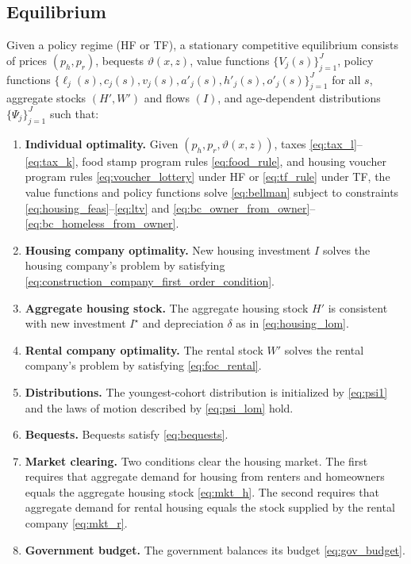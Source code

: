 \documentclass[parskip=full]{article}
\theoremstyle{plain}
\theoremstyle{definition}
\theoremstyle{remark}
\begin{document}
\subsection{Equilibrium}\label{sec:eqm}

Given a policy regime (HF or TF), a stationary competitive equilibrium consists of prices $(p_h,p_r)$, bequests $\vartheta(x,z)$, value functions $\{V_j(s)\}_{j=1}^J$, policy functions $\{\ell_j(s),c_j(s),v_j(s),a'_j(s),h'_j(s),o'_j(s)\}_{j=1}^J$ for all $s$, aggregate stocks $(H',W')$ and flows $(I)$, and age-dependent distributions $\{\Psi_j\}_{j=1}^J$ such that:

\begin{enumerate}
\item \textbf{Individual optimality.} Given $(p_h,p_r,\vartheta(x,z))$, taxes \eqref{eq:tax_l}--\eqref{eq:tax_k}, food stamp program rules \eqref{eq:food_rule}, and housing voucher program rules \eqref{eq:voucher_lottery} under HF or \eqref{eq:tf_rule} under TF, the value functions and policy functions solve \eqref{eq:bellman} subject to constraints \eqref{eq:housing_feas}--\eqref{eq:ltv} and \eqref{eq:bc_owner_from_owner}--\eqref{eq:bc_homeless_from_owner}.

\item \textbf{Housing company optimality.} New housing investment $I$ solves the housing company's problem by satisfying \eqref{eq:construction_company_first_order_condition}.

\item \textbf{Aggregate housing stock.} The aggregate housing 
stock $H'$ is consistent with new investment $I^{\star}$ and 
depreciation $\delta$ as in \eqref{eq:housing_lom}.

\item \textbf{Rental company optimality.} The rental stock $W'$ solves the rental company's problem by satisfying \eqref{eq:foc_rental}.

\item \textbf{Distributions.} The youngest-cohort distribution is initialized by \eqref{eq:psi1} and the laws of motion described by \eqref{eq:psi_lom} hold.

\item \textbf{Bequests.} Bequests satisfy \eqref{eq:bequests}.

\item \textbf{Market clearing.} Two conditions clear the 
housing market. The first requires that aggregate demand for 
housing from renters and homeowners equals the aggregate 
housing stock \eqref{eq:mkt_h}. The second requires that 
aggregate demand for rental housing equals the stock supplied 
by the rental company \eqref{eq:mkt_r}.

\item \textbf{Government budget.} The government balances its budget \eqref{eq:gov_budget}.
\end{enumerate}
\end{document}
